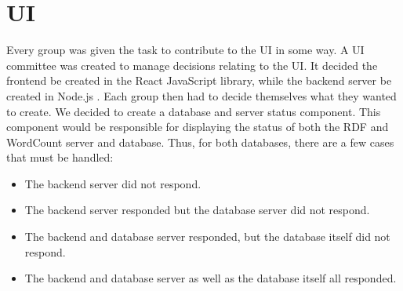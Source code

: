 \section{UI}

Every group was given the task to contribute to the \knox{} UI in some way. 
A UI committee was created to manage decisions relating to the UI. 
It decided the frontend be created in the React JavaScript library, while the backend server be created in Node.js .
Each group then had to decide themselves what they wanted to create. 
We decided to create a database and server status component. 
This component would be responsible for displaying the status of both the RDF and WordCount server and database. 
Thus, for both databases, there are a few cases that must be handled:
\begin{itemize}
	\item The backend server did not respond.
	\item The backend server responded but the database server did not respond.
	\item The backend and database server responded, but the database itself did not respond.
	\item The backend and database server as well as the database itself all responded.
\end{itemize}

